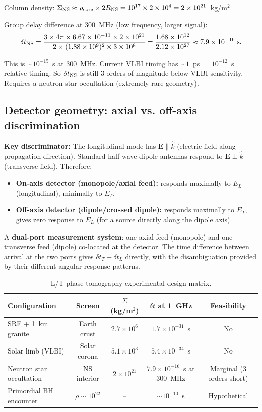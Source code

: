 \documentclass[11pt]{article}
\newcommand{\ee}[1]{\times 10^{#1}}
\begin{document}
Column density: $\Sigma_{\rm NS} \approx \rho_{\rm core}\times 2R_{\rm NS}
= 10^{17}\times2\ee{4} = 2\ee{21}$~kg/m$^2$.

Group delay difference at 300~MHz (low frequency, larger signal):
\begin{equation}
\delta t_{\rm NS} = \frac{3\times 4\pi\times 6.67\ee{-11}\times 2\ee{21}}
{2\times(1.88\ee{9})^2\times 3\ee{8}}
= \frac{1.68\ee{12}}{2.12\ee{27}} \approx 7.9\ee{-16}\;\text{s}.
\label{eq:dt-NS}
\end{equation}

This is $\sim 10^{-15}$~s at 300~MHz. Current VLBI timing has $\sim 1$~ps $= 10^{-12}$~s
relative timing. So $\delta t_{\rm NS}$ is still 3 orders of magnitude below VLBI
sensitivity. Requires a neutron star occultation (extremely rare geometry).

\subsection{Detector geometry: axial vs. off-axis discrimination}

\textbf{Key discriminator:} The longitudinal mode has $\mathbf{E} \parallel \hat{k}$
(electric field along propagation direction). Standard half-wave dipole antennas
respond to $\mathbf{E} \perp \hat{k}$ (transverse field). Therefore:
\begin{itemize}
\item \textbf{On-axis detector (monopole/axial feed):} responds maximally to
  $E_L$ (longitudinal), minimally to $E_T$.
\item \textbf{Off-axis detector (dipole/crossed dipole):} responds maximally to
  $E_T$, gives zero response to $E_L$ (for a source directly along the
  dipole axis).
\end{itemize}

A \textbf{dual-port measurement system}: one axial feed (monopole) and one
transverse feed (dipole) co-located at the detector. The time difference between
arrival at the two ports gives $\delta t_T - \delta t_L$ directly, with the
disambiguation provided by their different angular response patterns.

\begin{table}[h]
\centering
\caption{L/T phase tomography experimental design matrix.}
\label{tab:tomography}
\begin{tabular}{lcccc}
\toprule
Configuration & Screen & $\Sigma$ (kg/m$^2$) & $\delta t$ at 1~GHz & Feasibility \\
\midrule
SRF + 1~km granite & Earth crust & $2.7\ee{6}$ & $1.7\ee{-31}$~s & No \\
Solar limb (VLBI) & Solar corona & $5.1\ee{3}$ & $5.4\ee{-34}$~s & No \\
Neutron star occultation & NS interior & $2\ee{21}$ & $7.9\ee{-16}$~s at 300~MHz & Marginal (3 orders short) \\
Primordial BH encounter & $\rho\sim10^{22}$ & -- & $\sim 10^{-10}$~s & Hypothetical \\
\bottomrule
\end{tabular}
\end{table}
\end{document}
